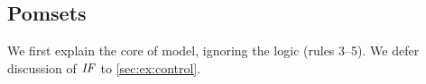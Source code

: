 





\subsection{Pomsets}
\label{sec:ex:pomset}

We first explain the core of model, ignoring the logic (rules 3--5).
We defer discussion of $\sIF{}$ to \textsection\ref{sec:ex:control}.

